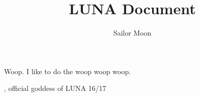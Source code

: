 \documentclass[]{luna} %
\author{Sailor Moon} %
\title{LUNA Document}
\begin{document}
\maketitle
Woop. I like to do the woop woop woop.

\inservice, official goddess of LUNA 16/17
\end{document}
